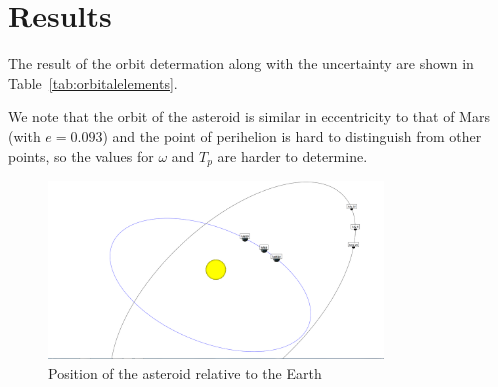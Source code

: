 \documentclass[12pt,journal,compsoc]{IEEEtran}
\begin{document}
\begin{table}[!t]
\centering
{}
\caption{V-Magnitude of 1951 Lick \label{tab:vmag}}
\end{table}

\section{Results}

The result of the orbit determation along with the uncertainty are shown in Table~\ref{tab:orbitalelements}.

\begin{table}[!t]
\centering
{}
\caption{Measured orbital elements \label{tab:orbitalelements}}
\end{table}

We note that the orbit of the asteroid is similar in eccentricity to that of Mars (with $e = 0.093$\cite{bib:horizons}) and the point of perihelion is hard to distinguish from other points, so the values for $\omega$ and $T_p$ are harder to determine. 

\begin{figure}[!t]
\centering
\includegraphics[width=3.5in]{LICK_Orbit2.png}
\caption{Position of the asteroid relative to the Earth}
\label{fig_sim}
\end{figure}
\end{document}
